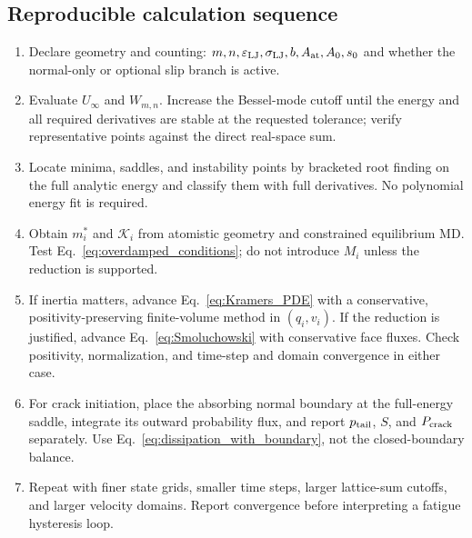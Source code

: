 \subsection{Reproducible calculation sequence}

\begin{enumerate}
  \item Declare geometry and counting: $m,n,\varepsilon_{\mathrm{LJ}},\sigma_{\mathrm{LJ}},b,A_{\rm at},A_0,s_0$ and whether the
  normal-only or optional slip branch is active.
  \item Evaluate $U_\infty$ and $W_{m,n}$. Increase the Bessel-mode cutoff until the energy and all
  required derivatives are stable at the requested tolerance; verify representative points against
  the direct real-space sum.
  \item Locate minima, saddles, and instability points by bracketed root finding on the full
  analytic energy and classify them with full derivatives. No polynomial energy fit is required.
  \item Obtain $m_i^*$ and $\mathcal K_i$ from atomistic geometry and constrained equilibrium MD.
  Test Eq.~\eqref{eq:overdamped_conditions}; do not introduce $M_i$ unless the reduction is
  supported.
  \item If inertia matters, advance Eq.~\eqref{eq:Kramers_PDE} with a conservative,
  positivity-preserving finite-volume method in $(q_i,v_i)$. If the reduction is justified, advance
  Eq.~\eqref{eq:Smoluchowski} with conservative face fluxes. Check positivity, normalization, and
  time-step and domain convergence in either case.
  \item For crack initiation, place the absorbing normal boundary at the full-energy saddle,
  integrate its outward probability flux, and report $p_{\rm tail}$, $S$, and $P_{\rm crack}$
  separately. Use Eq.~\eqref{eq:dissipation_with_boundary}, not the closed-boundary balance.
  \item Repeat with finer state grids, smaller time steps, larger lattice-sum cutoffs, and larger
  velocity domains. Report convergence before interpreting a fatigue hysteresis loop.
\end{enumerate}
